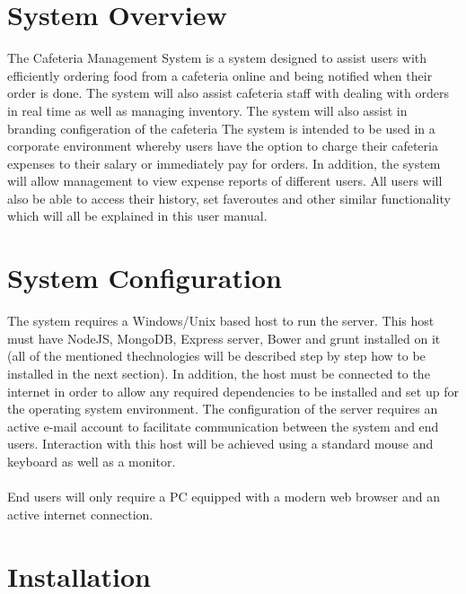 \documentclass[a4paper,12pt]{article}
\begin{document}
\pagebreak

\section{System Overview}
The Cafeteria Management System is a system designed to assist users with efficiently ordering food from a cafeteria online and being notified when their order is done. The system will also assist cafeteria staff with dealing with orders in real time as well as managing inventory. The system will also assist in branding configeration of the cafeteria The system is intended to be used in a corporate environment whereby users have the option to charge their cafeteria expenses to their salary or immediately pay for orders. In addition, the system will allow management to view expense reports of different users. All users will also be able to access their history, set faveroutes and other similar functionality which will all be explained in this user manual.

\section{System Configuration}
The system requires a Windows/Unix based host to run the server. This host must have NodeJS, MongoDB, Express server, Bower and grunt  installed on it (all of the mentioned thechnologies will be described step by step how to be installed in the next section). In addition, the host must be connected to the internet in order to allow any required dependencies to be installed and set up for the operating system environment. The configuration of the server requires an active e-mail account to facilitate communication between the system and end users. Interaction with this host will be achieved using a standard mouse and keyboard as well as a monitor.\\ 
\\
End users will only require a PC equipped with a modern web browser and an active internet connection.

\section{Installation}
\end{document}
